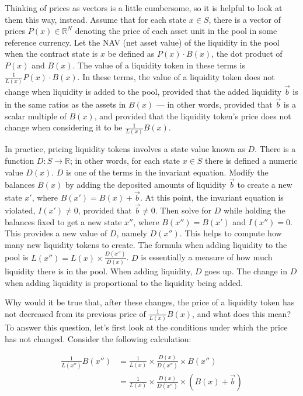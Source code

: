 \documentclass[12pt]{article}
\begin{document}
Thinking of prices as vectors is a little cumbersome, so it is helpful to look at them this way, instead. Assume that for each state $x \in S$, there is a vector of prices $P(x) \in \mathbb{R}^N$ denoting the price of each asset unit in the pool in some reference currency. Let the NAV (net asset value) of the liquidity in the pool when the contract state is $x$ be defined as $P(x) \cdot B(x)$, the dot product of $P(x)$ and $B(x)$. The value of a liquidity token in these terms is $\frac{1}{L(x)} P(x) \cdot B(x)$. In these terms, the value of a liquidity token does not change when liquidity is added to the pool, provided that the added liquidity $\vec{b}$ is in the same ratios as the assets in $B(x)$ --- in other words, provided that $\vec{b}$ is a scalar multiple of $B(x)$, and provided that the liquidity token's price does not change when considering it to be $\frac{1}{L(x)} B(x)$.

In practice, pricing liquidity tokens involves a state value known as $D$. There is a function $D : S \to \mathbb{R}$; in other words, for each state $x \in S$ there is defined a numeric value $D(x)$. $D$ is one of the terms in the invariant equation. Modify the balances $B(x)$ by adding the deposited amounts of liquidity $\vec{b}$ to create a new state $x'$, where $B(x') = B(x) + \vec{b}$. At this point, the invariant equation is violated, $I(x') \neq 0$, provided that $\vec{b} \neq 0$. Then solve for $D$ while holding the balances fixed to get a new state $x''$, where $B(x'') = B(x')$ and $I(x'') = 0$. This provides a new value of $D$, namely $D(x'')$. This helps to compute how many new liquidity tokens to create. The formula when adding liquidity to the pool is $L(x'') = L(x) \times \frac{D(x'')}{D(x)}$. $D$ is essentially a measure of how much liquidity there is in the pool. When adding liquidity, $D$ goes up. The change in $D$ when adding liquidity is proportional to the liquidity being added.

Why would it be true that, after these changes, the price of a liquidity token has not decreased from its previous price of $\frac{1}{L(x)} B(x)$, and what does this mean? To answer this question, let's first look at the conditions under which the price has not changed. Consider the following calculation:

\begin{equation}
	\begin{split}
	\frac{1}{L(x'')} B(x'') & = \frac{1}{L(x)} \times \frac{D(x)}{D(x'')} \times B(x'') \\
				& = \frac{1}{L(x)} \times \frac{D(x)}{D(x'')} \times (B(x) + \vec{b})
	\end{split}
	\label{eq:1}
\end{equation}
\end{document}
